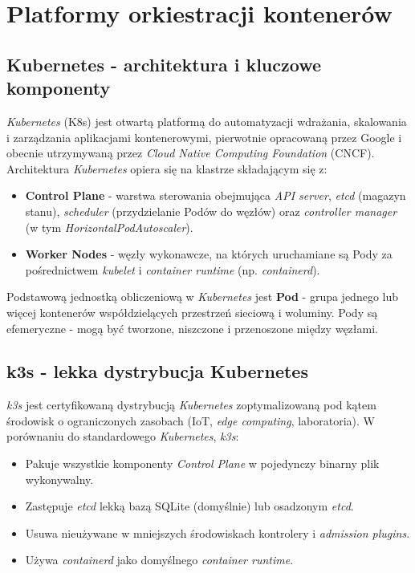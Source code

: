 \section{Platformy orkiestracji kontenerów}

\subsection{Kubernetes - architektura i kluczowe komponenty}

\textit{Kubernetes} (K8s) jest otwartą platformą do automatyzacji wdrażania, skalowania i zarządzania aplikacjami kontenerowymi, pierwotnie opracowaną przez Google i obecnie utrzymywaną przez \textit{Cloud Native Computing Foundation} (CNCF).
Architektura \textit{Kubernetes} opiera się na klastrze składającym się z:

\begin{itemize}
  \item \textbf{Control Plane} - warstwa sterowania obejmująca \textit{API server}, \textit{etcd} (magazyn stanu), \textit{scheduler} (przydzielanie Podów do węzłów) oraz \textit{controller manager} (w tym \textit{HorizontalPodAutoscaler}).
  \item \textbf{Worker Nodes} - węzły wykonawcze, na których uruchamiane są Pody za pośrednictwem \textit{kubelet} i \textit{container runtime} (np. \textit{containerd}).
\end{itemize}

Podstawową jednostką obliczeniową w \textit{Kubernetes} jest \textbf{Pod} - grupa jednego lub więcej kontenerów współdzielących przestrzeń sieciową i woluminy. Pody są efemeryczne - mogą być tworzone, niszczone i przenoszone między węzłami.

\subsection{k3s - lekka dystrybucja Kubernetes}

\textit{k3s} jest certyfikowaną dystrybucją \textit{Kubernetes} zoptymalizowaną pod kątem środowisk o ograniczonych zasobach (IoT, \textit{edge computing}, laboratoria). W porównaniu do standardowego \textit{Kubernetes}, \textit{k3s}:

\begin{itemize}
  \item Pakuje wszystkie komponenty \textit{Control Plane} w pojedynczy binarny plik wykonywalny.
  \item Zastępuje \textit{etcd} lekką bazą SQLite (domyślnie) lub osadzonym \textit{etcd}.
  \item Usuwa nieużywane w mniejszych środowiskach kontrolery i \textit{admission plugins}.
  \item Używa \textit{containerd} jako domyślnego \textit{container runtime}.
\end{itemize}

